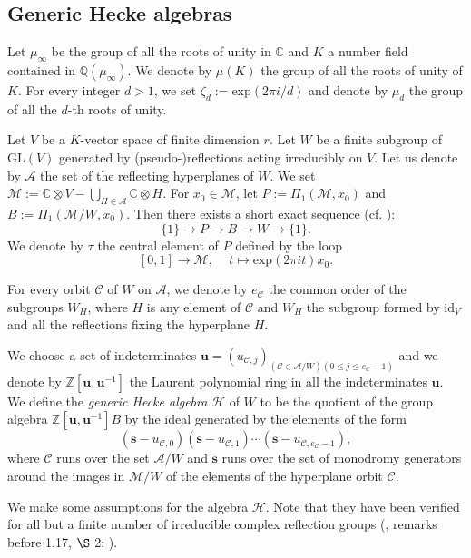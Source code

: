 \documentclass[10pt,a4paper,titlepage]{article}
\begin{document}
\subsection{Generic Hecke algebras}

Let $\mu_\infty$ be the group of all the roots of unity in
$\mathbb{C}$ and $K$ a number field contained in
$\mathbb{Q}(\mu_\infty)$. We denote by $\mu(K)$ the group of all the
roots of unity of $K$. For every integer $d>1$, we set
$\zeta_d:=\mathrm{exp}(2\pi i/d)$ and denote by $\mu_d$ the group of
all the $d$-th roots of unity. 

Let $V$ be a $K$-vector space of
finite dimension $r$. Let $W$ be a finite subgroup of $\mathrm{GL}(V)$ generated by
(pseudo-)reflections acting irreducibly on $V$. Let us denote by $\mathcal{A}$ the set of the
reflecting hyperplanes of $W$. We set $\mathcal{M} := \mathbb{C} \otimes V - 
\bigcup_{H \in \mathcal{A}} \mathbb{C} \otimes H$. For $x_0 \in \mathcal{M}$, 
let $P:=\Pi_1(\mathcal{M},x_0)$ and $B:=\Pi_1(\mathcal{M}/W,x_0)$. Then there exists a short exact 
sequence (cf. \cite{BMR}):
$$\{1\}\rightarrow P \rightarrow B \rightarrow W \rightarrow\{1\}.$$
We denote by $\tau$ the central element of $P$ defined by the loop
$$[0,1] \rightarrow \mathcal{M}, \,\,\,\,\,\,\, t \mapsto \mathrm{exp}(2\pi it)x_0.$$ 

For every orbit $\mathcal{C}$ of $W$ on $\mathcal{A}$, we denote by
$e_{\mathcal{C}}$ the common order of the subgroups $W_H$, where $H$
is any element of $\mathcal{C}$ and $W_H$ the subgroup formed by $\mathrm{id}_V$
and all the reflections fixing the hyperplane $H$.

We choose a set of indeterminates
$\textbf{u}=(u_{\mathcal{C},j})_{(\mathcal{C} \in
\mathcal{A}/W)(0\leq j \leq e_{\mathcal{C}}-1)}$ and we denote by
$\mathbb{Z}[\textbf{u},\textbf{u}^{-1}]$ the Laurent polynomial ring
in all the indeterminates $\textbf{u}$. We define the \emph{generic
Hecke algebra} $\mathcal{H}$ of $W$ to be the quotient of the group
algebra $\mathbb{Z}[\textbf{u},\textbf{u}^{-1}]B$ by the ideal
generated by the elements of the form
$$(\textbf{s}-u_{\mathcal{C},0})(\textbf{s}-u_{\mathcal{C},1}) \cdots (\textbf{s}-u_{\mathcal{C},e_{\mathcal{C}}-1}),$$
where $\mathcal{C}$ runs over the set $\mathcal{A}/W$ and
$\textbf{s}$ runs over the set of monodromy generators around the
images in $\mathcal{M}/W$ of the elements of the hyperplane
orbit $\mathcal{C}$.

We make some assumptions for the algebra $\mathcal{H}$. Note that
they have been verified for all but a finite number of irreducible
complex reflection groups (\cite{BMM2}, remarks before 1.17, $\S$ 2;
\cite{GIM}).
\end{document}
